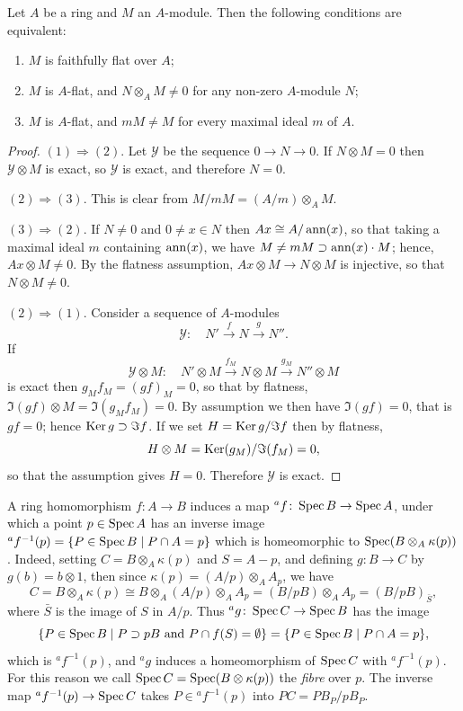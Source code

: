 \begin{theorem}\label{thm:7.2}
Let $A$ be a ring and $M$ an $A$-module. Then the following
conditions are equivalent:
\begin{enumerate}[(1)]
  \item $M$ is faithfully flat over $A$;
  \item $M$ is $A$-flat, and $N \otimes_A M \neq 0$ for any non-zero $A$-module $N$;
  \item $M$ is $A$-flat, and $mM \neq M$ for every maximal ideal $m$ of $A$.
\end{enumerate}
\end{theorem}

\begin{proof}
$(1) \Rightarrow (2)$. Let $\mathcal{Y}$ be the sequence $0 \to N \to 0$. If $N \otimes M = 0$ then
$\mathcal{Y} \otimes M$ is exact, so $\mathcal{Y}$ is exact, and therefore $N = 0$.

$(2) \Rightarrow (3)$. This is clear from $M/mM = (A/m) \otimes_A M$.

$(3) \Rightarrow (2)$. If $N \neq 0$ and $0 \neq x \in N$ then $Ax \cong A/\operatorname{ann}(x)$, so that taking a
maximal ideal $m$ containing $\operatorname{ann}(x)$, we have $M \neq mM \supset \operatorname{ann}(x) \cdot M$;
hence, $Ax \otimes M \neq 0$. By the flatness assumption, $Ax \otimes M \to N \otimes M$ is
injective, so that $N \otimes M \neq 0$.

$(2) \Rightarrow (1)$. Consider a sequence of $A$-modules
\[
  \mathcal{Y}\colon \quad N' \xrightarrow{f} N \xrightarrow{g} N''.
\]
If
\[
  \mathcal{Y} \otimes M\colon \quad N' \otimes M \xrightarrow{f_M} N \otimes M \xrightarrow{g_M} N'' \otimes M
\]
is exact then $g_M f_M = (gf)_M = 0$, so that by flatness, $\Im(gf) \otimes M =
\Im(g_M f_M) = 0$. By assumption we then have $\Im(gf) = 0$, that is $gf = 0$;
hence $\operatorname{Ker} g \supset \Im f$. If we set $H = \operatorname{Ker} g/\Im f$ then by flatness,
\[
  H \otimes M = \operatorname{Ker}(g_M)/\Im(f_M) = 0,
\]
so that the assumption gives $H = 0$. Therefore $\mathcal{Y}$ is exact.
\end{proof}

A ring homomorphism $f\colon A \to B$ induces a map ${}^a f\colon \operatorname{Spec} B \to \operatorname{Spec} A$,
under which a point $p \in \operatorname{Spec} A$ has an inverse image ${}^a f^{-1}(p) =
\{P \in \operatorname{Spec} B \mid P \cap A = p\}$ which is homeomorphic to $\operatorname{Spec}(B \otimes_A \kappa(p))$.
Indeed, setting $C = B \otimes_A \kappa(p)$ and $S = A - p$, and defining $g\colon B \to C$ by
$g(b) = b \otimes 1$, then since $\kappa(p) = (A/p) \otimes_A A_p$, we have
\[
  C = B \otimes_A \kappa(p) \cong B \otimes_A (A/p) \otimes_A A_p = (B/pB) \otimes_A A_p = (B/pB)_{\bar{S}},
\]
where $\bar{S}$ is the image of $S$ in $A/p$. Thus ${}^a g\colon \operatorname{Spec} C \to \operatorname{Spec} B$ has the image
\[
  \{P \in \operatorname{Spec} B \mid P \supset pB \text{ and } P \cap f(S) = \emptyset\}
   = \{P \in \operatorname{Spec} B \mid P \cap A = p\},
\]
which is ${}^a f^{-1}(p)$, and ${}^a g$ induces a homeomorphism of $\operatorname{Spec} C$ with
${}^a f^{-1}(p)$. For this reason we call $\operatorname{Spec} C = \operatorname{Spec}(B \otimes \kappa(p))$ the \emph{fibre} over $p$.
The inverse map ${}^a f^{-1}(p) \to \operatorname{Spec} C$ takes $P \in {}^a f^{-1}(p)$ into $PC = PB_P/pB_P$.

